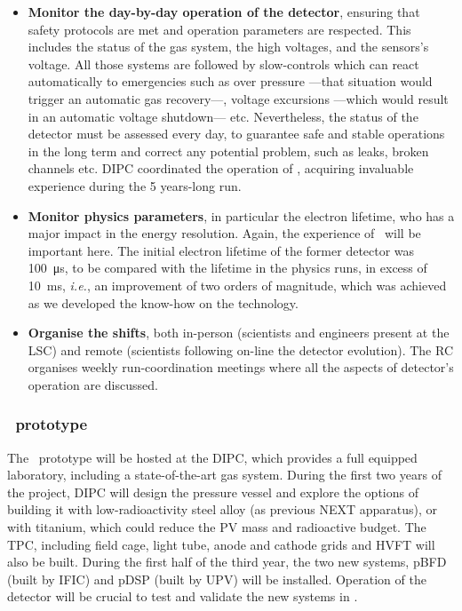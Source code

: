 \begin{itemize}[noitemsep,topsep=0pt,parsep=0pt,partopsep=0pt]
\item {\bf Monitor the day-by-day operation of the detector}, ensuring that safety protocols are met and operation parameters are respected. This includes the status of the gas system, the high voltages, and the sensors's voltage. All those systems are followed by slow-controls which can react automatically to emergencies such as over pressure ---that situation would trigger an automatic gas recovery---, voltage excursions ---which would result in an automatic voltage shutdown--- etc. Nevertheless, the status of the detector must be assessed every day, to guarantee safe and stable operations in the long term and correct any potential problem, such as leaks, broken channels etc. DIPC coordinated the operation of \NEW, acquiring invaluable experience during the 5 years-long run. 
 
\item {\bf Monitor physics parameters},  in particular the electron lifetime, who has a major impact in the energy resolution. Again, the experience of \NEW\ will be important here. The initial electron lifetime of the former detector was \SI{100}{\micro\second}, to be compared with the lifetime in the physics runs, in excess of 
\SI{10}{\milli\second}, \emph{i.e.}, an improvement of two orders of magnitude, which was achieved as we developed the know-how on the technology. 

\item {\bf Organise the shifts}, both in-person (scientists and engineers present at the LSC) and remote (scientists following on-line the detector evolution). The RC organises weekly run-coordination meetings where all the aspects of detector's operation are discussed. 
\end{itemize}


\subsubsection*{\HDEMO\ prototype}


The \HDEMO\ prototype will be hosted at the DIPC, which provides a full equipped laboratory, including a state-of-the-art gas system.  During the first two years of the project, DIPC will design the pressure vessel and explore the options of building it with low-radioactivity steel alloy (as previous NEXT apparatus), or with titanium, which could reduce the PV mass and radioactive budget. The TPC, including field cage, light tube, anode and cathode grids and HVFT will also be built.  During the first half of the third year, the two new systems, pBFD (built by IFIC) and pDSP (built by UPV) will be installed. Operation of the detector will be crucial to test and validate the new systems in \NHD. 

